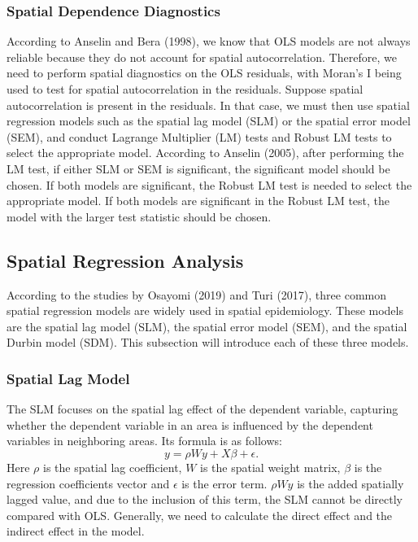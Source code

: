 \subsubsection{Spatial Dependence Diagnostics}
\label{sec:3.4.3.3}
According to Anselin and Bera (1998), we know that OLS models are not always reliable because they do not account for spatial autocorrelation. Therefore, we need to perform spatial diagnostics on the OLS residuals, with Moran's I being used to test for spatial autocorrelation in the residuals. Suppose spatial autocorrelation is present in the residuals. In that case, we must then use spatial regression models such as the spatial lag model (SLM) or the spatial error model (SEM), and conduct Lagrange Multiplier (LM) tests and Robust LM tests to select the appropriate model. According to Anselin (2005), after performing the LM test, if either SLM or SEM is significant, the significant model should be chosen. If both models are significant, the Robust LM test is needed to select the appropriate model. If both models are significant in the Robust LM test, the model with the larger test statistic should be chosen.


\subsection{Spatial Regression Analysis}
\label{sec:3.4.4}
According to the studies by Osayomi (2019) and Turi (2017), three common spatial regression models are widely used in spatial epidemiology. These models are the spatial lag model (SLM), the spatial error model (SEM), and the spatial Durbin model (SDM). This subsection will introduce each of these three models.
\subsubsection{Spatial Lag Model}
\label{sec:3.4.4.1}
The SLM focuses on the spatial lag effect of the dependent variable, capturing whether the dependent variable in an area is influenced by the dependent variables in neighboring areas. Its formula is as follows:
\begin{equation}
y=\rho W y+X \beta+\epsilon.
\end{equation}
Here $\rho$ is the spatial lag coefficient, $W$ is the spatial weight matrix, $\beta$ is the regression coefficients vector and $\epsilon$ is the error term. $\rho W y$ is the added spatially lagged value, and due to the inclusion of this term, the SLM cannot be directly compared with OLS. Generally, we need to calculate the direct effect and the indirect effect in the model.
